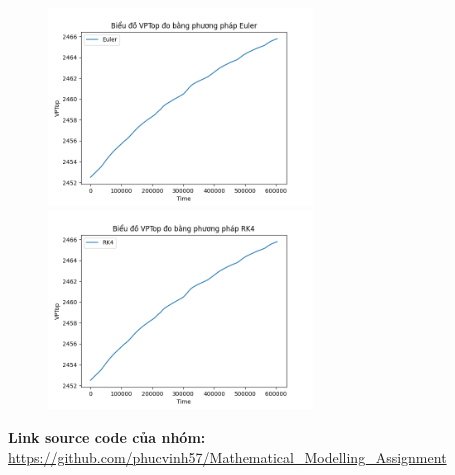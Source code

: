 \documentclass[a4paper]{article}
\begin{document}
\begin{figure}[h]
\begin{center}
\includegraphics[width=7cm]{5b_TOP_Euler.png}
\includegraphics[width=7cm]{5b_TOP_RK4.png}
\end{center}
\end{figure}

\newpage

\begin{thebibliography}{80}


\textbf{Link source code của nhóm: }
\url{https://github.com/phucvinh57/Mathematical_Modelling_Assignment}


\end{thebibliography}
\end{document}
